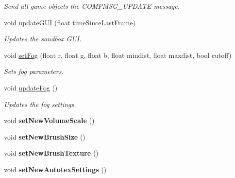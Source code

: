 \begin{DoxyCompactItemize}
\begin{DoxyCompactList}\small\item\em \-Send all game objects the \-C\-O\-M\-P\-M\-S\-G\-\_\-\-U\-P\-D\-A\-T\-E message. \end{DoxyCompactList}\item 
\hypertarget{classGame_a351a31a463a87af982308443b4f3491f}{
void \hyperlink{classGame_a351a31a463a87af982308443b4f3491f}{update\-G\-U\-I} (float time\-Since\-Last\-Frame)}
\label{d9/d68/classGame_a351a31a463a87af982308443b4f3491f}

\begin{DoxyCompactList}\small\item\em \-Updates the sandbox \-G\-U\-I. \end{DoxyCompactList}\item 
\hypertarget{classGame_a2448288d715f205b0595f6b7cd4ffe18}{
void \hyperlink{classGame_a2448288d715f205b0595f6b7cd4ffe18}{set\-Fog} (float r, float g, float b, float mindist, float maxdist, bool cutoff)}
\label{d9/d68/classGame_a2448288d715f205b0595f6b7cd4ffe18}

\begin{DoxyCompactList}\small\item\em \-Sets fog parameters. \end{DoxyCompactList}\item 
\hypertarget{classGame_afbabc65a0c9eb6aa3a75f42509ed9fe1}{
void \hyperlink{classGame_afbabc65a0c9eb6aa3a75f42509ed9fe1}{update\-Fog} ()}
\label{d9/d68/classGame_afbabc65a0c9eb6aa3a75f42509ed9fe1}

\begin{DoxyCompactList}\small\item\em \-Updates the fog settings. \end{DoxyCompactList}\item 
\hypertarget{classGame_a9c94c2b7e9d96ac81094f835a09ab222}{
void {\bfseries set\-New\-Volume\-Scale} ()}
\label{d9/d68/classGame_a9c94c2b7e9d96ac81094f835a09ab222}

\item 
\hypertarget{classGame_ad2854016128953116df1577fde2415ab}{
void {\bfseries set\-New\-Brush\-Size} ()}
\label{d9/d68/classGame_ad2854016128953116df1577fde2415ab}

\item 
\hypertarget{classGame_a98e0a1a0040340277fcab17048ff4210}{
void {\bfseries set\-New\-Brush\-Texture} ()}
\label{d9/d68/classGame_a98e0a1a0040340277fcab17048ff4210}

\item 
\hypertarget{classGame_a3114be7f8c93c1da4c744e22dd2ba183}{
void {\bfseries set\-New\-Autotex\-Settings} ()}
\label{d9/d68/classGame_a3114be7f8c93c1da4c744e22dd2ba183}


\end{DoxyCompactItemize}
